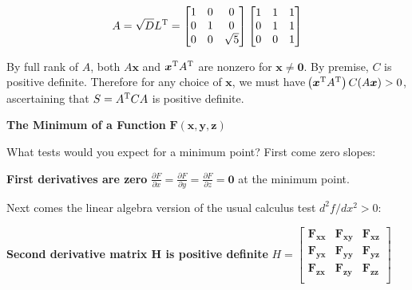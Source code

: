 \documentclass[a4paper]{article}
\begin{document}
\[
	A = \sqrt{D}L^{\textsc{T}} =
	\begin{bmatrix}
		1 & 0 & 0 \\
		0 & 1 & 0 \\
		0 & 0 & \sqrt{5} \\
	\end{bmatrix}
	\begin{bmatrix}
		1 & 1 & 1 \\
		0 & 1 & 1 \\
		0 & 0 & 1 \\
	\end{bmatrix}
\]


By full rank of \(A\), both \(A \bm{x}\) and \(\bm{x}^{\textsc{T}}A^{\textsc{T}}\) are nonzero for \(\bm{x} \neq \bm{0}\). By premise, \(C\) is positive definite. Therefore for any choice of \(\bm{x}\), we must have \(\!\left( \bm{x}^{\textsc{T}}A^{\textsc{T}} \right) C \!\left( A \bm{x} \right) > 0\), ascertaining that \(S = A^{\textsc{T}}CA\) is positive definite. 

\begin{center}
\centering
\textbf{The Minimum of a Function} \(\bm{F \!\left( x,y,z \right)}\)
\end{center}
What tests would you expect for a minimum point? First come zero slopes:

\noindent \textbf{First derivatives are zero} \(\displaystyle{\frac{\partial F}{\partial x} = \frac{\partial F}{\partial y} = \frac{\partial F}{\partial z} = \bm{0}}\) at the minimum point.

\noindent Next comes the linear algebra version of the usual calculus test \(d^{2}f/dx^{2} > 0\):

\noindent \textbf{Second derivative matrix \(\bm{H}\) is positive definite} \(H =
\begin{bmatrix}
	\bm{F_{xx}} & \bm{F_{xy}} & \bm{F_{xz}} \\
	\bm{F_{yx}} & \bm{F_{yy}} & \bm{F_{yz}} \\
	\bm{F_{zx}} & \bm{F_{zy}} & \bm{F_{zz}} \\
\end{bmatrix} \)
\end{document}
